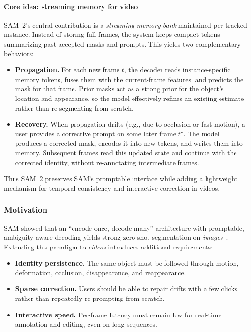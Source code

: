 \begin{enrichment}
\begin{enrichment}
		\paragraph{Core idea: streaming memory for video}
		SAM~2’s central contribution is a \emph{streaming memory bank} maintained per tracked instance. Instead of storing full frames, the system keeps compact tokens summarizing past accepted masks and prompts. This yields two complementary behaviors:
		\begin{itemize}
			\item \textbf{Propagation.} For each new frame \(t\), the decoder reads instance-specific memory tokens, fuses them with the current-frame features, and predicts the mask for that frame. Prior masks act as a strong prior for the object’s location and appearance, so the model effectively refines an existing estimate rather than re-segmenting from scratch.
			\item \textbf{Recovery.} When propagation drifts (e.g., due to occlusion or fast motion), a user provides a corrective prompt on some later frame \(t^\star\). The model produces a corrected mask, encodes it into new tokens, and writes them into memory. Subsequent frames read this updated state and continue with the corrected identity, without re-annotating intermediate frames.
		\end{itemize}
		Thus SAM~2 preserves SAM’s promptable interface while adding a lightweight mechanism for temporal consistency and interactive correction in videos.
		
		\newpage
		
		\subsubsection{Motivation}
		\label{enr:subsubsec_chapter15_sam2_motivation}
		
		\noindent SAM showed that an ``encode once, decode many'' architecture with promptable, ambiguity-aware decoding yields strong zero-shot segmentation on \emph{images}~\cite{kirillov2023_sam}. Extending this paradigm to \emph{videos} introduces additional requirements:
		\begin{itemize}
			\item \textbf{Identity persistence.} The same object must be followed through motion, deformation, occlusion, disappearance, and reappearance.
			\item \textbf{Sparse correction.} Users should be able to repair drifts with a few clicks rather than repeatedly re-prompting from scratch.
			\item \textbf{Interactive speed.} Per-frame latency must remain low for real-time annotation and editing, even on long sequences.
		\end{itemize}
		

\end{enrichment}
\end{enrichment}
